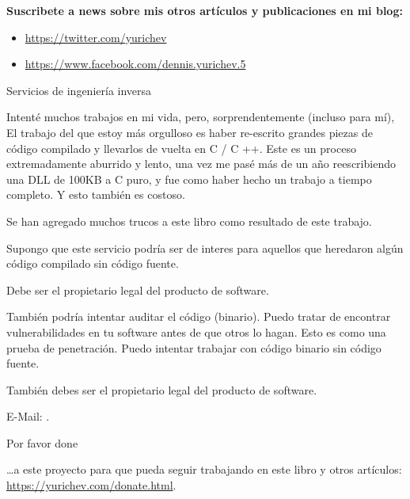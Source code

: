 
\vspace*{\fill}

\normalsize \textbf{Suscribete a news sobre mis otros artículos y publicaciones en mi blog:}

\bigskip
\bigskip
\bigskip

\begin{itemize}

\item \url{https://twitter.com/yurichev}

\item \url{https://www.facebook.com/dennis.yurichev.5}

\end{itemize}

\bigskip
\bigskip
\bigskip
\huge Servicios de ingeniería inversa
\normalsize

\bigskip
\bigskip
\bigskip

Intenté muchos trabajos en mi vida, pero, sorprendentemente (incluso para mí),
El trabajo del que estoy más orgulloso es haber re-escrito grandes piezas de código compilado y llevarlos de vuelta en C / C ++.
Este es un proceso extremadamente aburrido y lento, una vez me pasé más de un año reescribiendo una DLL de 100KB a C puro,
y fue como haber hecho un trabajo a tiempo completo.
Y esto también es costoso.

Se han agregado muchos trucos a este libro como resultado de este trabajo.

Supongo que este servicio podría ser de interes para aquellos que heredaron algún código compilado sin código fuente.

Debe ser el propietario legal del producto de software.

\bigskip

También podría intentar auditar el código (binario).
Puedo tratar de encontrar vulnerabilidades en tu software antes de que otros lo hagan.
Esto es como una prueba de penetración.
Puedo intentar trabajar con código binario sin código fuente.

También debes ser el propietario legal del producto de software.

E-Mail: \GTT{\EMAILS}.

\bigskip
\bigskip
\bigskip

\huge Por favor done
\normalsize

\bigskip
\bigskip
\bigskip

\dots a este proyecto para que pueda seguir trabajando en este libro y otros artículos: \\
\url{https://yurichev.com/donate.html}.

